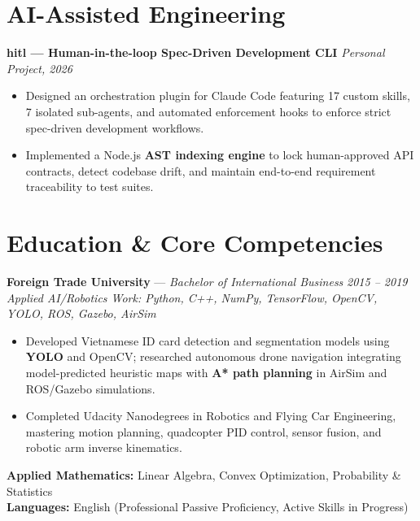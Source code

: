 \documentclass[9pt,a4paper]{extarticle}
\begin{document}
\section*{AI-Assisted Engineering}
\noindent\textbf{hitl --- Human-in-the-loop Spec-Driven Development CLI} \hfill \textit{Personal Project, 2026}
\begin{itemize}
    \item Designed an orchestration plugin for Claude Code featuring 17 custom skills, 7 isolated sub-agents, and automated enforcement hooks to enforce strict spec-driven development workflows.
    \item Implemented a Node.js \textbf{AST indexing engine} to lock human-approved API contracts, detect codebase drift, and maintain end-to-end requirement traceability to test suites.
\end{itemize}
\section*{Education \& Core Competencies}
\noindent\textbf{Foreign Trade University} --- \textit{Bachelor of International Business} \hfill \textit{2015 -- 2019}\\
\textit{Applied AI/Robotics Work: Python, C++, NumPy, TensorFlow, OpenCV, YOLO, ROS, Gazebo, AirSim}
\begin{itemize}
    \item Developed Vietnamese ID card detection and segmentation models using \textbf{YOLO} and OpenCV; researched autonomous drone navigation integrating model-predicted heuristic maps with \textbf{A* path planning} in AirSim and ROS/Gazebo simulations.
    \item Completed Udacity Nanodegrees in Robotics and Flying Car Engineering, mastering motion planning, quadcopter PID control, sensor fusion, and robotic arm inverse kinematics.
\end{itemize}
\smallskip
\noindent\textbf{Applied Mathematics:} Linear Algebra, Convex Optimization, Probability \& Statistics\\
\noindent\textbf{Languages:} English (Professional Passive Proficiency, Active Skills in Progress)
\end{document}
